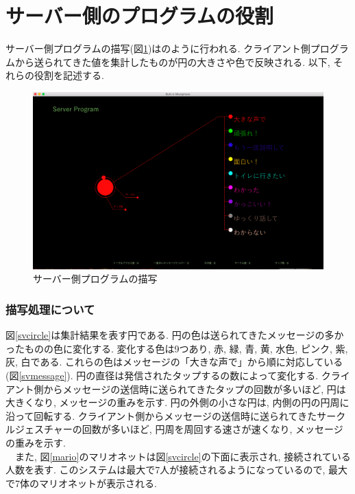 \documentclass{funthesis}
\begin{document}
\section{サーバー側のプログラムの役割}
サーバー側プログラムの描写(図\ref{server})はのように行われる. クライアント側プログラムから送られてきた値を集計したものが円の大きさや色で反映される. 以下, それらの役割を記述する. 
 \begin{figure}[H]
 \begin{center}
  \includegraphics[width=120mm]{./img/server.png}
 \end{center}
 \caption{サーバー側プログラムの描写}
 \label{server}
\end{figure}

\subsubsection{描写処理について}
図\ref{svcircle}は集計結果を表す円である. 円の色は送られてきたメッセージの多かったものの色に変化する. 変化する色は9つあり, 赤, 緑, 青, 黄, 水色, ピンク, 紫, 灰, 白である. これらの色はメッセージの「大きな声で」から順に対応している(図\ref{svmessage}). 円の直径は発信されたタップするの数によって変化する. クライアント側からメッセージの送信時に送られてきたタップの回数が多いほど, 円は大きくなり, メッセージの重みを示す. 円の外側の小さな円は, 内側の円の円周に沿って回転する. クライアント側からメッセージの送信時に送られてきたサークルジェスチャーの回数が多いほど, 円周を周回する速さが速くなり, メッセージの重みを示す. \\
　また, 図\ref{mario}のマリオネットは図\ref{svcircle}の下面に表示され, 接続されている人数を表す. このシステムは最大で7人が接続されるようになっているので, 最大で7体のマリオネットが表示される. 
\end{document}
